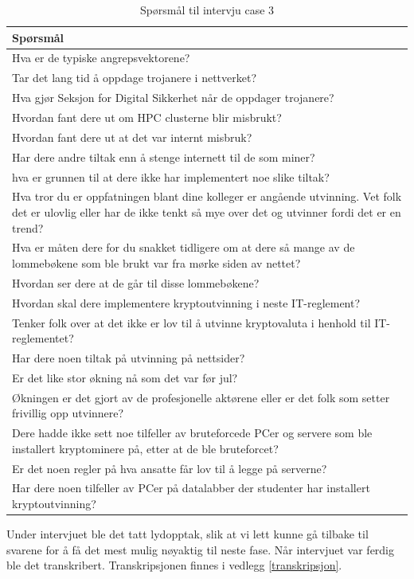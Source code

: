 \begin{table}[H]
    \centering
    \begin{tabular}{|m{30em}|} 
        \hline
        \cellcolor{yellow} Spørsmål  \\
        \hline
        Hva er de typiske angrepsvektorene?  \\
        \hline
        Tar det lang tid å oppdage trojanere i nettverket? \\ 
        \hline
        Hva gjør Seksjon for Digital Sikkerhet når de oppdager trojanere? \\
        \hline
        Hvordan fant dere ut om HPC clusterne blir misbrukt? \\
        \hline
        Hvordan fant dere ut at det var internt misbruk?\\
        \hline
        Har dere andre tiltak enn å stenge internett til de som miner? \\
        \hline
        hva er grunnen til at dere ikke har implementert noe slike tiltak? \\
        \hline
        Hva tror du er oppfatningen blant dine kolleger er angående utvinning. Vet folk det er ulovlig eller har de ikke tenkt så mye over det og utvinner fordi det er en trend? \\
        \hline
        Hva er måten dere for du snakket tidligere om at dere så mange av de lommebøkene som ble brukt var fra mørke siden av nettet?  \\
        \hline
        Hvordan ser dere at de går til disse lommebøkene? \\
        \hline
        Hvordan skal dere implementere kryptoutvinning i neste IT-reglement? \\
        \hline
        Tenker folk over at det ikke er lov til å utvinne kryptovaluta i henhold til IT-reglementet? \\
        \hline
        Har dere noen tiltak på utvinning på nettsider? \\
        \hline
        Er det like stor økning nå som det var før jul? \\
        \hline
        Økningen er det gjort av de profesjonelle aktørene eller er det folk som setter frivillig opp utvinnere? \\
        \hline
        Dere hadde ikke sett noe tilfeller av bruteforcede PCer og servere som ble installert kryptominere på, etter at de ble bruteforcet?  \\
        \hline
        Er det noen regler på hva ansatte får lov til å legge på serverne? \\
        \hline
        Har dere noen tilfeller av PCer på datalabber der studenter har installert kryptoutvinning? \\
        \hline
    \end{tabular}
    \caption{Spørsmål til intervju case 3}
    \label{tab:spm-intervju}
\end{table}
Under intervjuet ble det tatt lydopptak, slik at vi lett kunne gå tilbake til svarene for å få det mest mulig nøyaktig til neste fase. Når intervjuet var ferdig ble det transkribert. Transkripsjonen finnes i vedlegg \ref{transkripsjon}.
